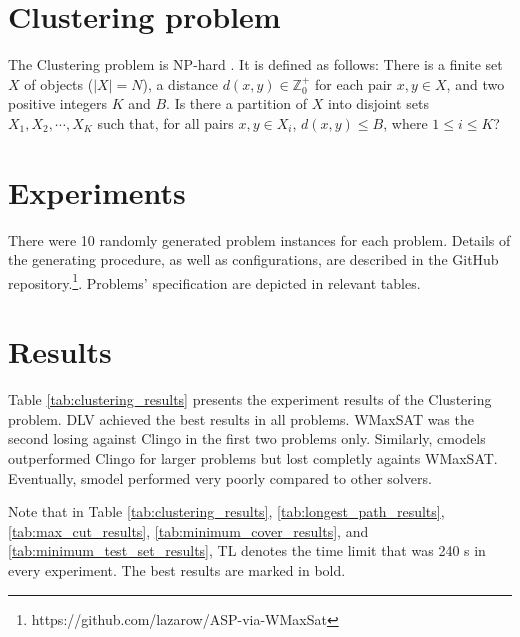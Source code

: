 \documentclass[]{article}
\begin{document}
\section{Clustering problem}

The Clustering problem is NP-hard \cite{brucker1978complexity}. It is defined as follows:
There is a finite set $ X $ of objects ($ |X| = N $), a distance $ d(x, y) \in \mathbb{Z}^{+}_{0} $ for each pair
$ x,y \in X $, and two positive integers $ K $ and $ B $. Is there a partition of $ X $ into disjoint sets $ X_1, X_2, \cdots, X_K $
such that, for all pairs $ x,y \in X_i $, $ d(x,y) \leq B $, where $ 1 \leq i \leq K $?

\section{Experiments}

There were 10 randomly generated problem instances for each problem.
Details of the generating procedure, as well as configurations, are described 
in the GitHub repository.\footnote{https://github.com/lazarow/ASP-via-WMaxSat}.
Problems' specification are depicted in relevant tables.

\section{Results}

Table \ref{tab:clustering_results} presents the experiment results of the Clustering problem.
DLV achieved the best results in all problems. WMaxSAT was the second losing against Clingo in the first two problems only.
Similarly, cmodels outperformed Clingo for larger problems but lost completly againts WMaxSAT.
Eventually, smodel performed very poorly compared to other solvers.

Note that in Table \ref{tab:clustering_results}, \ref{tab:longest_path_results}, 
\ref{tab:max_cut_results}, \ref{tab:minimum_cover_results}, and \ref{tab:minimum_test_set_results},
TL denotes the time limit that was 240 s in every experiment. The best results are marked in bold.
\end{document}
